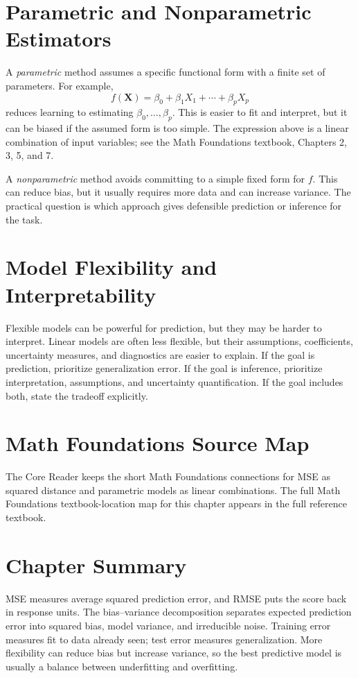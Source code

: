 {\section{Parametric and Nonparametric Estimators}

A \emph{parametric} method assumes a specific functional form with a finite set of parameters.  For example,
\begin{equation}
  f(\mathbf{X})=\beta_0+\beta_1X_1+\cdots+\beta_pX_p
  \label{eq:ch2-parametric-linear}
\end{equation}
reduces learning to estimating $\beta_0,\ldots,\beta_p$.  This is easier to fit and interpret, but it can be biased if the assumed form is too simple.  The expression above is a linear combination of input variables; see the Math Foundations textbook, Chapters 2, 3, 5, and 7.

A \emph{nonparametric} method avoids committing to a simple fixed form for $f$.  This can reduce bias, but it usually requires more data and can increase variance.  The practical question is which approach gives defensible prediction or inference for the task.

\section{Model Flexibility and Interpretability}

Flexible models can be powerful for prediction, but they may be harder to interpret.  Linear models are often less flexible, but their assumptions, coefficients, uncertainty measures, and diagnostics are easier to explain.  If the goal is prediction, prioritize generalization error.  If the goal is inference, prioritize interpretation, assumptions, and uncertainty quantification.  If the goal includes both, state the tradeoff explicitly.

\section{Math Foundations Source Map}

The Core Reader keeps the short Math Foundations connections for MSE as squared distance and parametric models as linear combinations.  The full Math Foundations textbook-location map for this chapter appears in the full reference textbook.

\section{Chapter Summary}

MSE measures average squared prediction error, and RMSE puts the score back in response units.  The bias--variance decomposition separates expected prediction error into squared bias, model variance, and irreducible noise.  Training error measures fit to data already seen; test error measures generalization.  More flexibility can reduce bias but increase variance, so the best predictive model is usually a balance between underfitting and overfitting.
}
